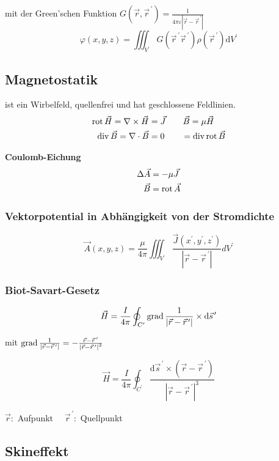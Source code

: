 mit der Green'schen Funktion $G\left(\vec{r}, \vec{r}^{\,\prime}\right)=\frac{1}{4 \pi \varepsilon\left|\vec{r}-\vec{r}^{\,\prime}\right|}$
\[\varphi(x, y, z)=\iiint_{V^{\prime}} G\left(\vec{r}^{\,\prime} \vec{r}^{\,\prime}\right) \rho\left(\vec{r}^{\,\prime}\right) \mathrm{d} V^{\prime}\]


\subsection{Magnetostatik}
ist ein Wirbelfeld, quellenfrei und hat geschlossene Feldlinien.
\begin{align*}
    \operatorname{rot} \vec{H} = \nabla \times \vec{H} & = \vec{J}  \qquad \vec{B} = \mu \vec{H}   \\
    \operatorname{div} \vec{B} = \nabla \cdot \vec{B}  & = 0        \qquad = \operatorname{div} \operatorname{rot} \vec{B}
\end{align*}

\textbf{Coulomb-Eichung}
\begin{align*}
    \Delta \vec{A} & = - \mu \vec{J}  \\
    \vec{B}        & = \operatorname{rot} \vec{A}
\end{align*}

\subsubsection{Vektorpotential in Abhängigkeit von der Stromdichte}
\[ \vec{A}(x, y, z)=\frac{\mu}{4 \pi} \iiint_{V^{\prime}} \frac{\vec{J}\left(x^{\prime}, y^{\prime}, z^{\prime}\right)}{\left|\vec{r}-\vec{r}^{\,\prime}\right|} d V^{\prime} \]

\subsubsection{Biot-Savart-Gesetz}
\[
    \vec{H}=\frac{I}{4 \pi} \oint_{C^{\prime}} \operatorname{grad} \frac{1}{\left|\vec{r}-\vec{r}^{\,\prime}\right|} \times \mathrm{d} \vec{s}^{\,\prime}
\]

mit $\operatorname{grad} \frac{1}{\left|\vec{r}-\vec{r}^{\,\prime}\right|}=-\frac{\vec{r}-\vec{r}^{\,\prime}}{\left|\vec{r}-\vec{r}^{\,\prime}\right|^{3}}$

\[
    \vec{H}=\frac{I}{4 \pi} \oint_{C^{\prime}} \frac{\mathrm{d} \vec{s}^{\,\prime} \times\left(\vec{r}-\vec{r}^{\,\prime}\right)}{\left|\vec{r}-\vec{r}^{\,\prime}\right|^{3}}
\]

$\vec{r}:$ Aufpunkt $\quad \vec{r}^{\,\prime}:$ Quellpunkt


\subsection{Skineffekt}

